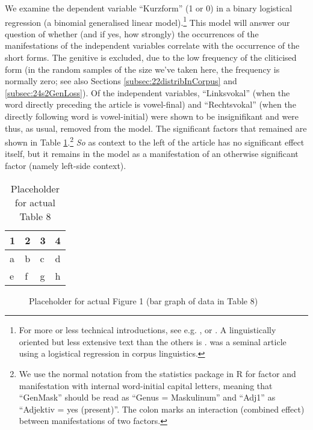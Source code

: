 We examine the dependent variable ``Kurzform'' (1 or 0) in a binary logistical regression (a binomial generalised linear model).\footnote{
	For more or less technical introductions, see e.g. \citet{BackhausEa2006}, \citet{FahrmeirEa2009} or \citet{ZuurEa2009}. A linguistically oriented but less extensive text than the others is \citet{Johnson2008}. \citet{BresnanEa2007} was a seminal article using a logistical regression in corpus linguistics.}
This model will answer our question of whether (and if yes, how strongly) the occurrences of the manifestations of the independent variables correlate with the occurrence of the short forms.
The genitive is excluded, due to the low frequency of the cliticised form (in the random samples of the size we've taken here, the frequency is normally zero; see also Sections \ref{subsec:22distribInCorpus} and \ref{subsec:24s2GenLoss}).
Of the independent variables, ``Linksvokal'' (when the word directly preceding the article is vowel-final) and ``Rechtsvokal'' (when the directly following word is vowel-initial) were shown to be insignifikant and were thus, as usual, removed from the model.
The significant factors that remained are shown in Table \ref{tab:0008}.\footnote{
	We use the normal notation from the statistics package in R \citep{RCoreTeam2014} for factor and manifestation with internal word-initial capital letters, meaning that ``GenMask'' should be read as ``Genus = Maskulinum'' and ``Adj1'' as ``Adjektiv = yes (present)''.
	The colon marks an interaction (combined effect) between manifestations of two factors.}
\textit{So} as context to the left of the article has no significant effect itself, but it remains in the model as a manifestation of an otherwise significant factor (namely left-side context).

\begin{table}
	\centering
	\begin{tabular}{llll}
		\toprule
		\textbf{1} & \textbf{2} & \textbf{3} & \textbf{4} \\
		\midrule
		a & b & c & d \\
		e & f & g & h \\
		\bottomrule
	\end{tabular}
	\caption{Placeholder for actual Table 8}
	\label{tab:0008}
\end{table}

\begin{figure}[htpb!]
	\centering
	\caption{Placeholder for actual Figure 1 (bar graph of data in Table 8)}
	\label{fig:0001}
\end{figure}

